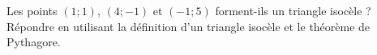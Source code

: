 
\begin{exercice}\label{exosmath-0410}

    Les points \( (1;1)\), \( (4;-1)\) et \( (-1;5)\) forment-ils un triangle isocèle ? Répondre en utilisant la définition d'un triangle isocèle et le théorème de Pythagore.

\end{exercice}
